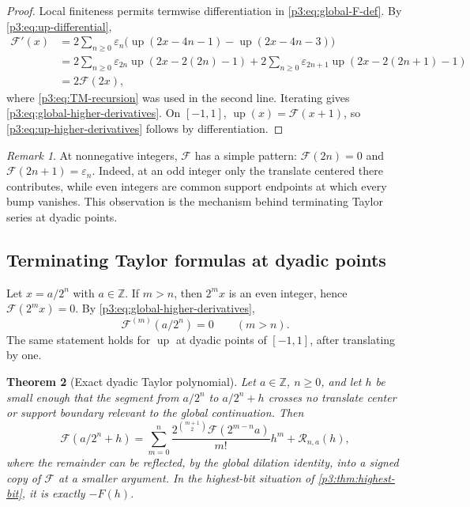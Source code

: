 \documentclass[11pt]{article}
\numberwithin{equation}{section}
\newtheorem{theorem}{Theorem}[section]
\theoremstyle{definition}
\theoremstyle{remark}
\newtheorem{remark}[theorem]{Remark}
\newcommand{\Z}{\mathbb Z}
\newcommand{\GF}{\mathcal F}
\newcommand{\upf}{\operatorname{up}}
\newcommand{\eps}{\varepsilon}
\begin{document}
\begin{proof}
Local finiteness permits termwise differentiation in \eqref{p3:eq:global-F-def}.  By \eqref{p3:eq:up-differential},
\begin{align*}
 \GF'(x)
 &=2\sum_{n\ge0}\eps_n\bigl(\upf(2x-4n-1)-\upf(2x-4n-3)\bigr)\\
 &=2\sum_{n\ge0}\eps_{2n}\upf(2x-2(2n)-1)
   +2\sum_{n\ge0}\eps_{2n+1}\upf(2x-2(2n+1)-1)\\
 &=2\GF(2x),
\end{align*}
where \eqref{p3:eq:TM-recursion} was used in the second line.  Iterating gives \eqref{p3:eq:global-higher-derivatives}.  On $[-1,1]$, $\upf(x)=\GF(x+1)$, so \eqref{p3:eq:up-higher-derivatives} follows by differentiation.
\end{proof}

\begin{remark}
At nonnegative integers, $\GF$ has a simple pattern: $\GF(2n)=0$ and $\GF(2n+1)=\eps_n$.  Indeed, at an odd integer only the translate centered there contributes, while even integers are common support endpoints at which every bump vanishes.  This observation is the mechanism behind terminating Taylor series at dyadic points.
\end{remark}

\subsection{Terminating Taylor formulas at dyadic points}

Let $x=a/2^n$ with $a\in\Z$.  If $m>n$, then $2^m x$ is an even integer, hence $\GF(2^m x)=0$.  By \eqref{p3:eq:global-higher-derivatives},
\begin{equation}\label{p3:eq:dyadic-derivative-vanishing}
 \GF^{(m)}(a/2^n)=0\qquad(m>n).
\end{equation}
The same statement holds for $\upf$ at dyadic points of $[-1,1]$, after translating by one.

\begin{theorem}[Exact dyadic Taylor polynomial]\label{p3:thm:dyadic-Taylor}
Let $a\in\Z$, $n\ge0$, and let $h$ be small enough that the segment from $a/2^n$ to $a/2^n+h$ crosses no translate center or support boundary relevant to the global continuation.  Then
\begin{equation}\label{p3:eq:dyadic-Taylor}
 \GF(a/2^n+h)=
 \sum_{m=0}^{n}\frac{2^{\binom{m+1}{2}}\GF(2^{m-n}a)}{m!}h^m
 +\mathcal R_{n,a}(h),
\end{equation}
where the remainder can be reflected, by the global dilation identity, into a signed copy of $\GF$ at a smaller argument.  In the highest-bit situation of \cref{p3:thm:highest-bit}, it is exactly $-F(h)$.
\end{theorem}
\end{document}
